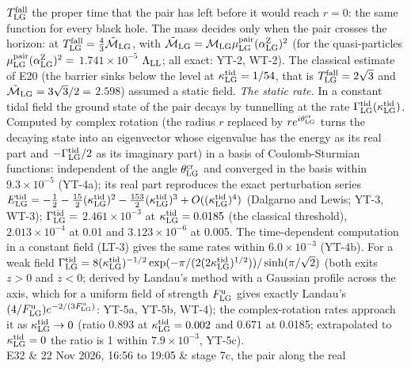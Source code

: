 \documentclass[
  10pt,
]{article}
\begin{document}
\begin{longtable}[]
\(T^{\rm fall}_{\rm LG}\) the proper time that the pair has left before
it would reach \(r=0\): the same function for every black hole. The mass
decides only when the pair crosses the horizon: at
\(T^{\rm fall}_{\rm LG}=\tfrac43\tilde{\mathcal M}_{\rm LG}\), with
\(\tilde{\mathcal M}_{\rm LG}=\mathcal M_{\rm LG}\mu^{\rm pair}_{\rm LG}(\alpha^{\rm Z}_{\rm LG})^2\)
(for the quasi-particles
\(\mu^{\rm pair}_{\rm LG}(\alpha^{\rm Z}_{\rm LG})^2=\)
\(1.741\times10^{-5}\) \(\Lambda_{\rm LL}\); all exact: YT-2, WT-2). The
classical estimate of E20 (the barrier sinks below the level at
\(\kappa^{\rm tid}_{\rm LG}=1/54\), that is
\(T^{\rm fall}_{\rm LG}=2\sqrt3\) and
\(\tilde{\mathcal M}_{\rm LG}=3\sqrt3/2=\) \(2.598\)) assumed a static
field. \emph{The static rate.} In a constant tidal field the ground
state of the pair decays by tunnelling at the rate
\(\Gamma^{\rm tid}_{\rm LG}(\kappa^{\rm tid}_{\rm LG})\). Computed by
complex rotation (the radius \(r\) replaced by
\(re^{i\theta^{\rm cr}_{\rm LG}}\) turns the decaying state into an
eigenvector whose eigenvalue has the energy as its real part and
\(-\Gamma^{\rm tid}_{\rm LG}/2\) as its imaginary part) in a basis of
Coulomb-Sturmian functions: independent of the angle
\(\theta^{\rm cr}_{\rm LG}\) and converged in the basis within
\(9.3\times10^{-5}\) (YT-4a); its real part reproduces the exact
perturbation series
\(E^{\rm tid}_{\rm LG}=-\tfrac12-\tfrac{15}2(\kappa^{\rm tid}_{\rm LG})^2-\tfrac{153}2(\kappa^{\rm tid}_{\rm LG})^3+O((\kappa^{\rm tid}_{\rm LG})^4)\)
(Dalgarno and Lewis; YT-3, WT-3); \(\Gamma^{\rm tid}_{\rm LG}=\)
\(2.461\times10^{-3}\) at \(\kappa^{\rm tid}_{\rm LG}=0.0185\) (the
classical threshold), \(2.013\times10^{-4}\) at 0.01 and
\(3.123\times10^{-6}\) at 0.005. The time-dependent computation in a
constant field (LT-3) gives the same rates within \(6.0\times10^{-3}\)
(YT-4b). For a weak field
\(\Gamma^{\rm tid}_{\rm LG}=8(\kappa^{\rm tid}_{\rm LG})^{-1/2}\exp(-\pi/(2(2\kappa^{\rm tid}_{\rm LG})^{1/2}))/\sinh(\pi/\sqrt2)\)
(both exits \(z>0\) and \(z<0\); derived by Landau's method with a
Gaussian profile across the axis, which for a uniform field of strength
\(F^{\rm u}_{\rm LG}\) gives exactly Landau's
\((4/F^{\rm u}_{\rm LG})e^{-2/(3F^{\rm u}_{\rm LG})}\): YT-5a, YT-5b,
WT-4); the complex-rotation rates approach it as
\(\kappa^{\rm tid}_{\rm LG}\to0\) (ratio \(0.893\) at
\(\kappa^{\rm tid}_{\rm LG}=0.002\) and \(0.671\) at 0.0185;
extrapolated to \(\kappa^{\rm tid}_{\rm LG}=0\) the ratio is 1 within
\(7.9\times10^{-3}\), YT-5c). \\
E32 & 22 Nov 2026, 16:56 to 19:05 & stage 7c, the pair along the real

\end{longtable}
\end{document}
